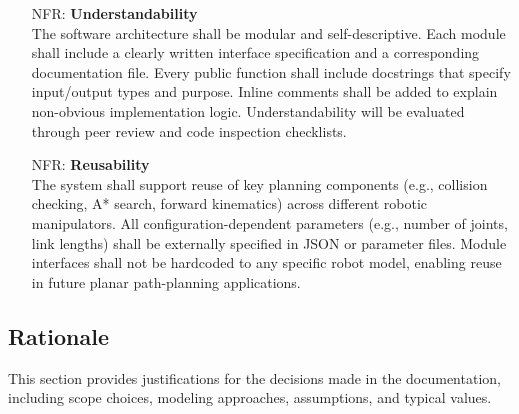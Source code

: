 \documentclass[12pt]{article}
\newcounter{nfrnum} %
\begin{document}
\begin{itemize}
  \item[NFR\refstepcounter{nfrnum}\thenfrnum \label{NFR_Understandability}:]  
    \textbf{Understandability} \\
    The software architecture shall be modular and self-descriptive. Each module shall include a clearly written interface specification and a corresponding documentation file. Every public function shall include docstrings that specify input/output types and purpose. Inline comments shall be added to explain non-obvious implementation logic. Understandability will be evaluated through peer review and code inspection checklists.
  
  \item[NFR\refstepcounter{nfrnum}\thenfrnum \label{NFR_Reusability}:]  
    \textbf{Reusability} \\
    The system shall support reuse of key planning components (e.g., collision checking, A* search, forward kinematics) across different robotic manipulators. All configuration-dependent parameters (e.g., number of joints, link lengths) shall be externally specified in JSON or parameter files. Module interfaces shall not be hardcoded to any specific robot model, enabling reuse in future planar path-planning applications.
  
  \end{itemize}
  

  \subsection{Rationale}

  This section provides justifications for the decisions made in the documentation, including scope choices, modeling approaches, assumptions, and typical values.
  
\end{document}
